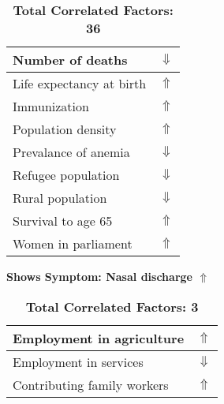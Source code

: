 \documentclass[12pt,notitlepage,oneside]{report}
\begin{document}
\begin{table}[!htb]
\begin{tabular}{|l|l|}
Number of deaths & $\Downarrow$\\ \hline
Life expectancy at birth & $\Uparrow$\\ \hline
Immunization & $\Uparrow$\\ \hline
Population density & $\Uparrow$\\ \hline
Prevalance of anemia & $\Downarrow$\\ \hline
Refugee population & $\Downarrow$\\ \hline
Rural population & $\Downarrow$\\ \hline
Survival to age 65 & $\Uparrow$\\ \hline
Women in parliament & $\Uparrow$\\ \hline
\end{tabular}
\caption*{\textbf{Total Correlated Factors: 36}}
\end{table}
\clearpage
\begin{table}[!htb]
\caption{\textbf{Shows Symptom: Nasal discharge $\Uparrow$}}
\centering
\label{Correlated Socio-economic Factors0}
\begin{tabular}{|l|l|}
\hline
Employment in agriculture & $\Uparrow$\\ \hline
Employment in services & $\Downarrow$\\ \hline
Contributing family workers & $\Uparrow$\\ \hline
\end{tabular}
\caption*{\textbf{Total Correlated Factors: 3}}
\end{table}
\end{document}

